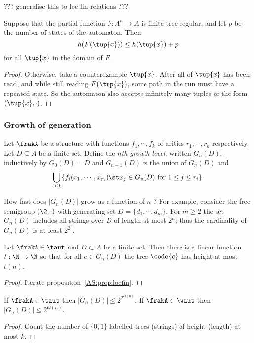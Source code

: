 ??? generalise this to loc fin relations ???
\begin{proposition} \label{AS:prop:locfin}
Suppose that the partial function $F:A^n \to A$ is finite-tree regular, and let $p$ be the number of states of the automaton.
Then
$$h(F(\tup{x}))
\leq h(\tup{x}) + p
$$
for all $\tup{x}$ in the domain of $F$.
\end{proposition}

\begin{proof}
Otherwise, take a counterexample  $\tup{x}$.
After all of $\tup{x}$ has been read, and while still reading $F(\tup{x})$, some path in the run must have a repeated state. 
So the automaton also accepts infinitely many tuples of the form $(\tup{x}, \cdot)$.
\end{proof}

\subsubsection{Growth of generation}

\begin{definition} \label{dfn:growth}
Let $\frakA$ be a structure with functions $f_1, \cdots, f_k$ of arities $r_1, \cdots, r_k$ respectively. 
Let $D \subseteq A$ be a finite set.
Define the
{\em $n$th growth level}, written $G_n(D)$, inductively by $G_0(D) = D$
and $G_{n+1}(D)$ is the union of $G_n(D)$ and
\[
\bigcup_{i\leq k} \{f_i(x_1,\cdots,x_{r_i}) \st x_j \in G_n(D) \text{ for } 1 \leq j \leq r_i\}.
\]
\end{definition}

How fast does $|G_n(D)|$ grow as a function of $n$ ?  For
example, consider the free semigroup $(\2,\cdot)$ with generating
set $D = \{d_1, \cdots, d_m\}$. For $m \geq 2$ the set $G_n(D)$ includes all strings over $D$ of length
at most $2^n$; thus the cardinality of $G_n(D)$ is at least $2^{2^{n}}$.

\begin{proposition} %
 \label{prop:growth}
Let $\frakA \in \taut$ and $D \subset A$ be a finite set. Then there is a
linear function $t:\N \rightarrow \N$ so that for all $e \in G_n(D)$ the tree $\code{e}$ has
height at most $t(n)$.
\end{proposition}
\begin{proof}
 Iterate proposition~\ref{AS:prop:locfin}.
\end{proof}

\begin{corollary} 
If $\frakA \in \taut$ then $|G_n(D)| \leq 2^{2^{O(n)}}$. If $\frakA \in \waut$ then 
$|G_n(D)| \leq 2^{O(n)}$.
\end{corollary}
\begin{proof}
Count the number of $\{0,1\}$-labelled trees (strings) of height (length) at most $k$.
\end{proof}

